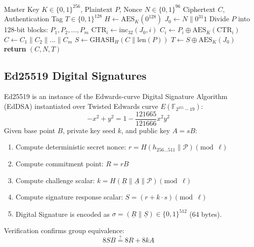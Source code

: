 \documentclass[11pt,a4paper]{article}
\begin{document}
\begin{algorithm}[H]
\caption{AES-256-GCM Encryption and Tag Generation}
\label{alg:aes_gcm}
\begin{algorithmic}[1]
\Require Master Key $K \in \{0,1\}^{256}$, Plaintext $P$, Nonce $N \in \{0,1\}^{96}$
\Ensure Ciphertext $C$, Authentication Tag $T \in \{0,1\}^{128}$
\State $H \leftarrow \text{AES}_K(0^{128})$ 
\State $J_0 \leftarrow N \parallel 0^{31}1$ 
\State Divide $P$ into 128-bit blocks: $P_1, P_2, \dots, P_m$
    \State $\text{CTR}_i \leftarrow \text{inc}_{32}(J_0, i)$
    \State $C_i \leftarrow P_i \oplus \text{AES}_K(\text{CTR}_i)$
\EndFor
\State $C \leftarrow C_1 \parallel C_2 \parallel \dots \parallel C_m$
\State $S \leftarrow \text{GHASH}_H(C \parallel \text{len}(P))$
\State $T \leftarrow S \oplus \text{AES}_K(J_0)$ 
\State \textbf{return} $(C, N, T)$
\end{algorithmic}
\end{algorithm}

\subsection{Ed25519 Digital Signatures}
Ed25519 is an instance of the Edwards-curve Digital Signature Algorithm (EdDSA) instantiated over Twisted Edwards curve $E(\mathbb{F}_{2^{255}-19})$:
\begin{equation}
-x^2 + y^2 = 1 - \frac{121665}{121666} x^2 y^2
\end{equation}
Given base point $B$, private key seed $k$, and public key $A = sB$:
\begin{enumerate}
    \item Compute deterministic secret nonce: $r = H(h_{256\dots 511} \parallel \mathcal{P}) \pmod \ell$
    \item Compute commitment point: $R = rB$
    \item Compute challenge scalar: $k = H(\underline{R} \parallel \underline{A} \parallel \mathcal{P}) \pmod \ell$
    \item Compute signature response scalar: $S = (r + k \cdot s) \pmod \ell$
    \item Digital Signature is encoded as $\sigma = (\underline{R} \parallel \underline{S}) \in \{0,1\}^{512}$ (64 bytes).
\end{enumerate}

Verification confirms group equivalence:
\begin{equation}
8 S B \stackrel{?}{=} 8 R + 8 k A
\end{equation}
\end{document}

